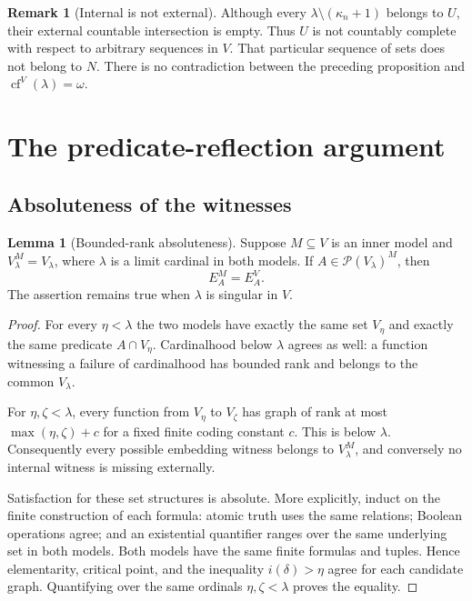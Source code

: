 \documentclass[11pt,letterpaper]{article}
\theoremstyle{definition}
\newtheorem{lemma}[definition]{Lemma}
\newtheorem{remark}[definition]{Remark}
\numberwithin{equation}{section}
\newcommand{\cf}{\operatorname{cf}}
\newcommand{\Pow}{\mathcal P}
\begin{document}
\begin{remark}[Internal is not external]\label{rem:internal}
Although every $\lambda\setminus(\kappa_n+1)$ belongs to $U$, their external countable intersection is empty. Thus $U$ is not countably complete with respect to arbitrary sequences in $V$. That particular sequence of sets does not belong to $N$. There is no contradiction between the preceding proposition and $\cf^V(\lambda)=\omega$.
\end{remark}

\section{The predicate-reflection argument}\label{sec:predicate}

\subsection{Absoluteness of the witnesses}

\begin{lemma}[Bounded-rank absoluteness]\label{lem:absolute}
Suppose $M\subseteq V$ is an inner model and $V_\lambda^M=V_\lambda$, where $\lambda$ is a limit cardinal in both models. If $A\in\Pow(V_\lambda)^M$, then
\[
 E_A^M=E_A^V.
\]
The assertion remains true when $\lambda$ is singular in $V$.
\end{lemma}

\begin{proof}
For every $\eta<\lambda$ the two models have exactly the same set $V_\eta$ and exactly the same predicate $A\cap V_\eta$. Cardinalhood below $\lambda$ agrees as well: a function witnessing a failure of cardinalhood has bounded rank and belongs to the common $V_\lambda$.

For $\eta,\zeta<\lambda$, every function from $V_\eta$ to $V_\zeta$ has graph of rank at most $\max(\eta,\zeta)+c$ for a fixed finite coding constant $c$. This is below $\lambda$. Consequently every possible embedding witness belongs to $V_\lambda^M$, and conversely no internal witness is missing externally.

Satisfaction for these set structures is absolute. More explicitly, induct on the finite construction of each formula: atomic truth uses the same relations; Boolean operations agree; and an existential quantifier ranges over the same underlying set in both models. Both models have the same finite formulas and tuples. Hence elementarity, critical point, and the inequality $i(\delta)>\eta$ agree for each candidate graph. Quantifying over the same ordinals $\eta,\zeta<\lambda$ proves the equality.
\end{proof}
\end{document}
